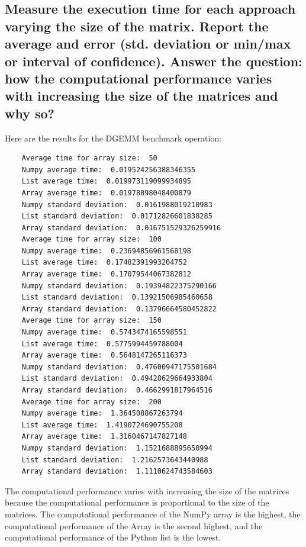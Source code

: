 \documentclass{article}
\begin{document}

\subsection{Measure the execution time for each approach varying the size of the matrix. Report the average and error (std. deviation or min/max or interval of confidence). Answer the question: how the computational performance varies with increasing the size of the matrices and why so?}

Here are the results for the DGEMM benchmark operation:
\begin{lstlisting}
    Average time for array size:  50
    Numpy average time:  0.019524256388346355
    List average time:  0.019973119099934895
    Array average time:  0.01978898048400879
    Numpy standard deviation:  0.0161988019210983
    List standard deviation:  0.01712826601838285
    Array standard deviation:  0.016751529326259916
    Average time for array size:  100
    Numpy average time:  0.23694856961568198
    List average time:  0.17482391993204752
    Array average time:  0.17079544067382812
    Numpy standard deviation:  0.19394822375290166
    List standard deviation:  0.13921506985460658
    Array standard deviation:  0.13796664580452822
    Average time for array size:  150
    Numpy average time:  0.5743474165598551
    List average time:  0.5775994459788004
    Array average time:  0.5648147265116373
    Numpy standard deviation:  0.47600947175501684
    List standard deviation:  0.49428629664933804
    Array standard deviation:  0.4662991817964516
    Average time for array size:  200
    Numpy average time:  1.364508867263794
    List average time:  1.4190724690755208
    Array average time:  1.3160467147827148
    Numpy standard deviation:  1.1521688895650994
    List standard deviation:  1.2162573643440988
    Array standard deviation:  1.1110624743584603
\end{lstlisting}

The computational performance varies with increasing the size of the matrices because the computational performance is proportional to the size of the matrices.
The computational performance of the NumPy array is the highest, the computational performance of the Array is the second highest, and the computational performance of the Python list is the lowest.

\end{document}
